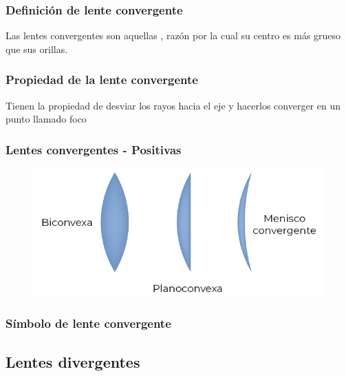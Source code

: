 \documentclass[14pt]{beamer}
\begin{document}
\begin{frame}
\frametitle{Definición de lente convergente}
Las lentes convergentes son aquellas , \pause razón por la cual su centro es más grueso que sus orillas.
\end{frame}
\begin{frame}
\frametitle{Propiedad de la lente convergente}
Tienen la propiedad de desviar los rayos hacia el eje y hacerlos converger en un punto llamado foco
\end{frame}
\begin{frame}
\frametitle{Lentes convergentes - Positivas}
\begin{figure}
    \centering
    \includegraphics[scale=2]{Imagenes/Lentes_convergentes_01.jpg}
\end{figure}
\end{frame}
\begin{frame}
\frametitle{Símbolo de lente convergente}
\begin{figure}
    \centering
\end{figure}
\end{frame}

\subsection{Lentes divergentes}
\end{document}
